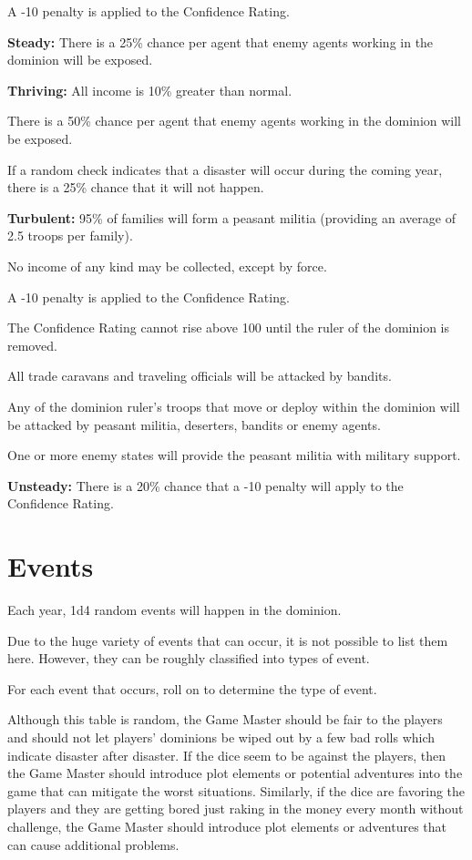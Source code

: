 \begin{multicols*}{2}
A -10 penalty is applied to the Confidence Rating.

\textbf{Steady:} There is a 25\% chance per agent that enemy agents working in the dominion will be exposed.

\textbf{Thriving:} All income is 10\% greater than normal.

There is a 50\% chance per agent that enemy agents working in the dominion will be exposed.

If a random check indicates that a disaster will occur during the coming year, there is a 25\% chance that it will not happen.

\textbf{Turbulent:} 95\% of families will form a peasant militia (providing an average of 2.5 troops per family).

No income of any kind may be collected, except by force.

A -10 penalty is applied to the Confidence Rating.

The Confidence Rating cannot rise above 100 until the ruler of the dominion is removed.

All trade caravans and traveling officials will be attacked by bandits.

Any of the dominion ruler’s troops that move or deploy within the dominion will be attacked by peasant militia, deserters, bandits or enemy agents.

One or more enemy states will provide the peasant militia with military support.

\textbf{Unsteady:} There is a 20\% chance that a -10 penalty will apply to the Confidence Rating.

\section{Events}
Each year, 1d4 random events will happen in the dominion.

Due to the huge variety of events that can occur, it is not possible to list them here. However, they can be roughly classified into types of event.

For each event that occurs, roll on  to determine the type of event.

Although this table is random, the Game Master should be fair to the players and should not let players’ dominions be wiped out by a few bad rolls which indicate disaster after disaster. If the dice seem to be against the players, then the Game Master should introduce plot elements or potential adventures into the game that can mitigate the worst situations. Similarly, if the dice are favoring the players and they are getting bored just raking in the money every month without challenge, the Game Master should introduce plot elements or adventures that can cause additional problems.


\end{multicols*}
